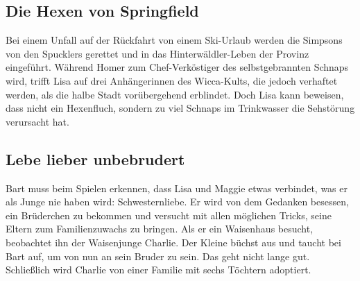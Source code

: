 
\subsection{Die Hexen von Springfield }
Bei einem Unfall auf der Rückfahrt von einem Ski-Urlaub werden die Simpsons von den Spucklers gerettet und in das Hinterwäldler-Leben der Provinz eingeführt. Während Homer zum Chef-Verköstiger des selbstgebrannten Schnaps wird, trifft Lisa auf drei Anhängerinnen des Wicca-Kults, die jedoch verhaftet werden, als die halbe Stadt vorübergehend erblindet. Doch Lisa kann beweisen, dass nicht ein Hexenfluch, sondern zu viel Schnaps im Trinkwasser die Sehstörung verursacht hat.


\subsection{Lebe lieber unbebrudert}
Bart muss beim Spielen erkennen, dass Lisa und Maggie etwas verbindet, was er als Junge nie haben wird: Schwesternliebe. Er wird von dem Gedanken besessen, ein Brüderchen zu bekommen und versucht mit allen möglichen Tricks, seine Eltern zum Familienzuwachs zu bringen. Als er ein Waisenhaus besucht, beobachtet ihn der Waisenjunge Charlie. Der Kleine büchst aus und taucht bei Bart auf, um von nun an sein Bruder zu sein. Das geht nicht lange gut. Schließlich wird Charlie von einer Familie mit sechs Töchtern adoptiert.



